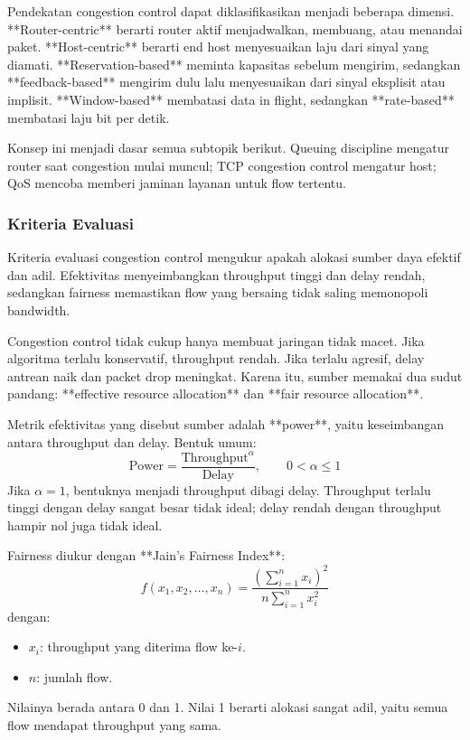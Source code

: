 Pendekatan congestion control dapat diklasifikasikan menjadi beberapa dimensi. **Router-centric** berarti router aktif menjadwalkan, membuang, atau menandai paket. **Host-centric** berarti end host menyesuaikan laju dari sinyal yang diamati. **Reservation-based** meminta kapasitas sebelum mengirim, sedangkan **feedback-based** mengirim dulu lalu menyesuaikan dari sinyal eksplisit atau implisit. **Window-based** membatasi data in flight, sedangkan **rate-based** membatasi laju bit per detik.

Konsep ini menjadi dasar semua subtopik berikut. Queuing discipline mengatur router saat congestion mulai muncul; TCP congestion control mengatur host; QoS mencoba memberi jaminan layanan untuk flow tertentu.

\subsubsection{Kriteria Evaluasi}
\begin{jawab}
Kriteria evaluasi congestion control mengukur apakah alokasi sumber daya efektif dan adil. Efektivitas menyeimbangkan throughput tinggi dan delay rendah, sedangkan fairness memastikan flow yang bersaing tidak saling memonopoli bandwidth.
\end{jawab}

Congestion control tidak cukup hanya membuat jaringan tidak macet. Jika algoritma terlalu konservatif, throughput rendah. Jika terlalu agresif, delay antrean naik dan packet drop meningkat. Karena itu, sumber memakai dua sudut pandang: **effective resource allocation** dan **fair resource allocation**.

Metrik efektivitas yang disebut sumber adalah **power**, yaitu keseimbangan antara throughput dan delay. Bentuk umum:
\[
    \text{Power} = \frac{\text{Throughput}^{\alpha}}{\text{Delay}}, \qquad 0 < \alpha \leq 1
\]
Jika $\alpha=1$, bentuknya menjadi throughput dibagi delay. Throughput terlalu tinggi dengan delay sangat besar tidak ideal; delay rendah dengan throughput hampir nol juga tidak ideal.

Fairness diukur dengan **Jain's Fairness Index**:
\[
    f(x_1,x_2,\ldots,x_n)
    =
    \frac{\left(\sum_{i=1}^{n}x_i\right)^2}
    {n\sum_{i=1}^{n}x_i^2}
\]
dengan:
\begin{itemize}
    \item $x_i$: throughput yang diterima flow ke-$i$.
    \item $n$: jumlah flow.
\end{itemize}
Nilainya berada antara 0 dan 1. Nilai 1 berarti alokasi sangat adil, yaitu semua flow mendapat throughput yang sama.

